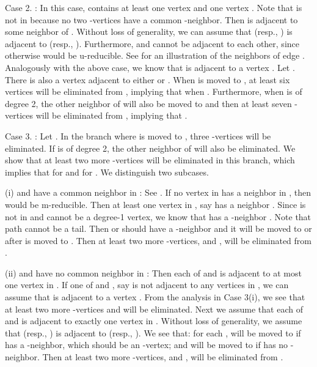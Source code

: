 \documentclass{elsart_TR2}
\begin{document}
\vspace{-0mm}\vspace{-0mm}

Case 2. : In this case,   contains at least one vertex  and one vertex .
Note that  is not in  because no two -vertices have a common -neighbor.
Then  is adjacent to some neighbor of . Without loss of generality, we can assume that
 (resp.,   )  is adjacent to   (resp.,  ).
Furthermore,  and  cannot be adjacent to each other, since otherwise  would be u-reducible.
See  for an illustration of  the neighbors of edge .
 Analogously with the above case, we know that  is adjacent to a vertex .
Let .
There is also a vertex  adjacent to either  or .
When  is moved to , at least six vertices  will be eliminated from ,
implying that  when .
Furthermore, when  is of degree 2, the other neighbor  of  will also be moved to  and
then at least seven -vertices  will be eliminated from ,
 implying that .



Case 3. : Let .
In the branch where  is moved to , three -vertices  will be eliminated. If  is of degree 2, the other neighbor  of  will also be eliminated. We show that at least two more -vertices will be eliminated in this branch,
which implies that  for  and
 for .
We distinguish  two subcases.

(i)  and  have a common neighbor in :
See .
If no vertex in   has a neighbor in , then  would be m-reducible.
Then at least one vertex in , say  has a neighbor .
Since  is not in  and  cannot be a degree-1 vertex, we know that  has a -neighbor .
Note that path  cannot be a tail. Then  or  should have a -neighbor  and it will be moved to  or  after  is moved to .
Then at least two more -vertices,  and , will be eliminated from .

(ii)  and   have no common neighbor in :
Then each of  and  is adjacent to at most one vertex in . If one of  and , say  is not adjacent to any vertices in , we can assume
that  is adjacent to a vertex . From the analysis in Case 3(i), we  see that at least two more -vertices  and  will be eliminated. Next we assume
that each of  and  is adjacent to exactly one vertex in . Without loss of generality, we assume that  (resp., ) is adjacent to   (resp.,  ).
We   see that: for each ,  will be moved to  if  has a  -neighbor,
which should be an -vertex; and  will be moved to  if  has no -neighbor.
Then at least two more -vertices,  and , will be eliminated from .
\end{document}
